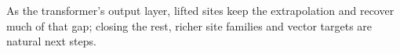 As the transformer's output layer, lifted sites keep the extrapolation and recover much of that gap; closing the
rest, richer site families and vector targets are natural next steps.
